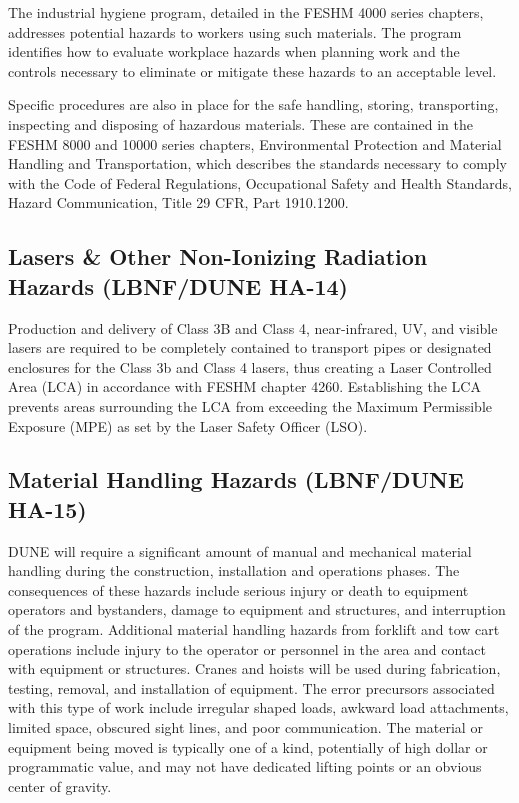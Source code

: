 The industrial hygiene program, detailed in the FESHM 4000 series
chapters, addresses potential hazards to workers using such
materials. The program identifies how to evaluate workplace hazards
when planning work and the controls necessary to eliminate or mitigate
these hazards to an acceptable level.

Specific procedures are also in place for the safe handling, storing,
transporting, inspecting and disposing of hazardous materials. These
are contained in the FESHM 8000 and 10000 series chapters,
Environmental Protection and Material Handling and Transportation,
which describes the standards necessary to comply with the Code of
Federal Regulations, Occupational Safety and Health Standards, Hazard
Communication, Title 29 CFR, Part 1910.1200.


\subsection{Lasers \& Other Non-Ionizing Radiation Hazards (LBNF/DUNE HA-14)}

Production and delivery of Class 3B and Class 4, near-infrared, UV,
and visible lasers are required to be completely contained to
transport pipes or designated enclosures for the Class 3b and Class 4
lasers, thus creating a Laser Controlled Area (LCA) in accordance with
FESHM chapter 4260.  Establishing the LCA prevents areas surrounding
the LCA from exceeding the Maximum Permissible Exposure (MPE) as set
by the Laser Safety Officer (LSO).

\subsection{Material Handling Hazards (LBNF/DUNE HA-15)}

DUNE will require a significant amount of manual and mechanical
material handling during the construction, installation and operations
phases.  The consequences of these hazards include serious injury or
death to equipment operators and bystanders, damage to equipment and
structures, and interruption of the program.  Additional material
handling hazards from forklift and tow cart operations include injury
to the operator or personnel in the area and contact with equipment or
structures. Cranes and hoists will be used during fabrication,
testing, removal, and installation of equipment. The error precursors
associated with this type of work include irregular shaped loads,
awkward load attachments, limited space, obscured sight lines, and
poor communication.  The material or equipment being moved is
typically one of a kind, potentially of high dollar or programmatic
value, and may not have dedicated lifting points or an obvious center
of gravity.

